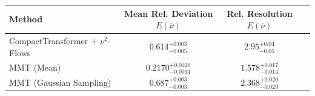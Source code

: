     \begin{tabular}{lccc}
        \toprule
        Method & Mean Rel. Deviation $E(\bar{\nu})$ & Rel. Resolution $E(\bar{\nu})$ \\
        \midrule
        CompactTransformer + $\nu^2$-Flows & $0.614^{+0.003}_{-0.005}$ & $2.95^{+0.04}_{-0.05}$ \\
        MMT (Mean) & $0.2170^{+0.0020}_{-0.0014}$ & $1.578^{+0.017}_{-0.014}$ \\
        MMT (Gaussian Sampling) & $0.687^{+0.003}_{-0.003}$ & $2.368^{+0.020}_{-0.029}$ \\
        \bottomrule
    \end{tabular}